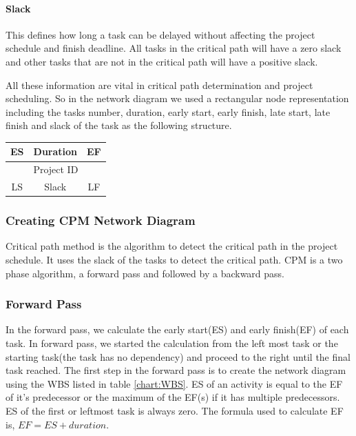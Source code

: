 \begin{spacing}{1}
 \paragraph{Slack}
 This defines how long a task can be delayed without affecting the project schedule and finish deadline. All tasks in the critical path will have a zero slack and other tasks that are not in the critical path will have a positive slack.
 
 All these information are vital in critical path determination and project scheduling. So in the network diagram we used a rectangular node representation including the tasks number, duration, early start, early finish, late start, late finish and slack of the task as the following structure.
 
 \begin{center}
\begin{tabular}{|c|c|c|}
	\hline
	ES & Duration & EF \\
	\hline
	\multicolumn{3}{|c|}{Project ID} \\
	\hline
	LS & Slack & LF \\
	\hline
\end{tabular}
\end{center}


\subsubsection{Creating CPM Network Diagram}
Critical path method is the algorithm to detect the critical path in the project schedule. It uses the slack of the tasks to detect the critical path. CPM is a two phase algorithm, a forward pass and followed by a backward pass.

\subsubsection{Forward Pass} 
In the forward pass, we calculate the early start(ES) and early finish(EF) of each task. In forward pass, we started the calculation from the left most task or the starting task(the task has no dependency) and proceed to the right until the final task reached. The first step in the forward pass is to create the network diagram using the WBS listed in table \ref{chart:WBS}. ES of an activity is equal to the EF of it's predecessor or the maximum of the EF(s) if it has multiple predecessors. ES of the first or leftmost task is always zero. The formula used to calculate EF is, $EF = ES + duration.$


\end{spacing}
